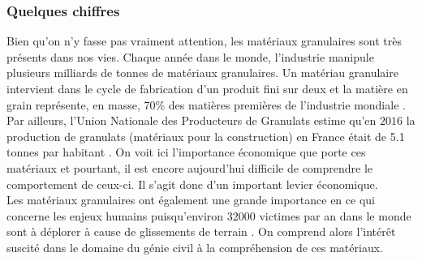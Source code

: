 		\subsubsection{Quelques chiffres}
			Bien qu'on n'y fasse pas vraiment attention, les matériaux granulaires sont très présents dans nos vies. Chaque année dans le monde, l'industrie manipule plusieurs milliards de tonnes de matériaux granulaires. Un matériau granulaire intervient dans le cycle de fabrication d'un produit fini sur deux et la matière en grain représente, en masse, \si{70}{\%} des matières premières de l'industrie mondiale \citep{thomas_poudres_2012}. Par ailleurs, l'Union Nationale des Producteurs de Granulats estime qu'en $2016$ la production de granulats (matériaux pour la construction) en France était de \num{5.1} tonnes par habitant \citep{unpg}. On voit ici l'importance économique que porte ces matériaux et pourtant, il est encore aujourd'hui difficile de comprendre le comportement de ceux-ci. Il s'agit donc d'un important levier économique.
			\\Les matériaux granulaires ont également une grande importance en ce qui concerne les enjeux humains puisqu'environ \num{32000} victimes par an dans le monde sont à déplorer à cause de glissements de terrain \citep{petley_global_2012}. On comprend alors l'intérêt suscité dans le domaine du génie civil à la compréhension de ces matériaux.
